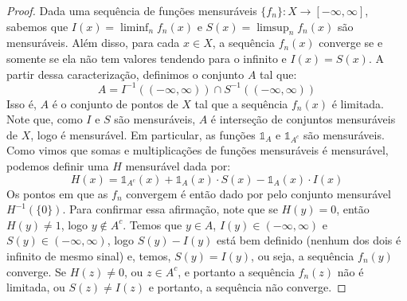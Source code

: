 \prob
\begin{proof}
    Dada uma sequência de funções mensuráveis $\{f_n\} : X \to [-\infty, \infty]$, sabemos que $I(x) = \liminf_n f_n(x)$ e $S(x) = \limsup_n f_n(x)$ são mensuráveis.
    Além disso, para cada $x \in X$, a sequência $f_n(x)$ converge se e somente se ela não tem valores tendendo para o infinito e $I(x) = S(x)$.
    A partir dessa caracterização, definimos o conjunto $A$ tal que:
    $$A = I^{-1}((-\infty, \infty)) \cap S^{-1}((-\infty, \infty))$$
    Isso é, $A$ é o conjunto de pontos de $X$ tal que a sequência $f_n(x)$ é limitada. Note que, como $I$ e $S$ são mensuráveis, $A$ é interseção
    de conjuntos mensuráveis de $X$, logo é mensurável. Em particular, as funções $\mathds{1}_A$ e $\mathds{1}_{A^c}$ são mensuráveis. Como vimos que somas e multiplicações
    de funções mensuráveis é mensurável, podemos definir uma $H$ mensurável dada por:
    $$H(x) = \mathds{1}_{A^c}(x) + \mathds{1}_A(x) \cdot S(x) - \mathds{1}_A(x) \cdot I(x) $$
    Os pontos em que as $f_n$ convergem é então dado por pelo conjunto mensurável $H^{-1}(\{0\})$. Para confirmar essa afirmação, note que
    se $H(y) = 0$, então $H(y) \neq 1$, logo $y \not \in A^c$. Temos que $y \in A$, $I(y) \in (-\infty,\infty)$ e $S(y) \in (-\infty, \infty)$, 
    logo $S(y) - I(y)$ está bem definido (nenhum dos dois é infinito de mesmo sinal) e, temos, $S(y) = I(y)$, ou seja, a sequência $f_n(y)$ converge.
    Se $H(z) \neq 0$, ou $z \in A^c$, e portanto a sequência $f_n(z)$ não é limitada, ou $S(z) \neq I(z)$ e portanto, a sequência não converge.  
\end{proof}

